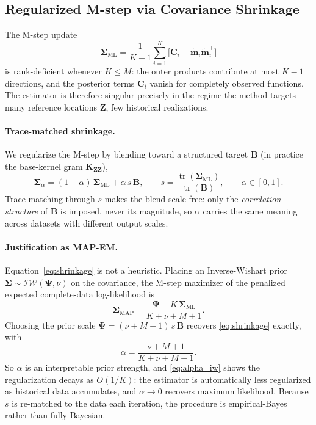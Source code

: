 \documentclass[10pt]{article}
\newcommand{\bZ}{\mathbf{Z}}
\newcommand{\bSigma}{\boldsymbol{\Sigma}}
\begin{document}
\subsection{Regularized M-step via Covariance Shrinkage}
\label{apd:shrinkage}

The M-step update
\begin{equation}
\label{eq:sigma_ml}
    \bSigma_{\text{ML}}
    = \frac{1}{K-1}\sum_{i=1}^{K}\Big[\mathbf{C}_i
      + \tilde{\mathbf{m}}_i \tilde{\mathbf{m}}_i^{\top}\Big]
\end{equation}
is rank-deficient whenever $K \le M$: the outer products contribute at most $K-1$
directions, and the posterior terms $\mathbf{C}_i$ vanish for completely observed
functions. The estimator is therefore singular precisely in the regime the method
targets --- many reference locations $\bZ$, few historical realizations.

\paragraph{Trace-matched shrinkage.}
We regularize the M-step by blending toward a structured target $\mathbf{B}$ (in
practice the base-kernel gram $\mathbf{K}_{\bZ\bZ}$),
\begin{equation}
\label{eq:shrinkage}
    \bSigma_\alpha = (1-\alpha)\,\bSigma_{\text{ML}} + \alpha\, s\, \mathbf{B},
    \qquad
    s = \frac{\operatorname{tr}(\bSigma_{\text{ML}})}{\operatorname{tr}(\mathbf{B})},
    \qquad \alpha \in [0,1].
\end{equation}
Trace matching through $s$ makes the blend scale-free: only the \emph{correlation
structure} of $\mathbf{B}$ is imposed, never its magnitude, so $\alpha$ carries the
same meaning across datasets with different output scales.

\paragraph{Justification as MAP-EM.}
Equation~\eqref{eq:shrinkage} is not a heuristic. Placing an Inverse-Wishart prior
$\bSigma\sim\mathcal{IW}(\boldsymbol{\Psi},\nu)$ on the covariance, the M-step
maximizer of the penalized expected complete-data log-likelihood is
\begin{equation}
    \bSigma_{\text{MAP}}
    = \frac{\boldsymbol{\Psi} + K\,\bSigma_{\text{ML}}}{K + \nu + M + 1}.
\end{equation}
Choosing the prior scale $\boldsymbol{\Psi} = (\nu + M + 1)\,s\,\mathbf{B}$ recovers
\eqref{eq:shrinkage} exactly, with
\begin{equation}
\label{eq:alpha_iw}
    \alpha = \frac{\nu + M + 1}{K + \nu + M + 1}.
\end{equation}
So $\alpha$ is an interpretable prior strength, and \eqref{eq:alpha_iw} shows the
regularization decays as $O(1/K)$: the estimator is automatically less regularized
as historical data accumulates, and $\alpha\to 0$ recovers maximum likelihood.
Because $s$ is re-matched to the data each iteration, the procedure is
empirical-Bayes rather than fully Bayesian.
\end{document}
